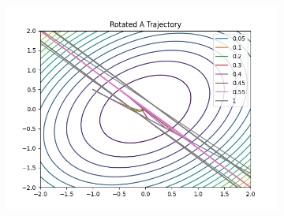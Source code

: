 \begin{answer}
\begin{figure}[H]
\begin{subfigure}[b]{0.49\textwidth}
    \includegraphics[width=\textwidth]{gd_convergence/trajectories_rotated.png}
  \end{subfigure}
\end{figure}
\newpage
\end{answer}